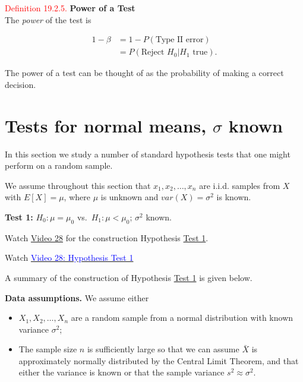 \documentclass[
]{book}
\providecommand{\tightlist}{%
  \setlength{\itemsep}{0pt}\setlength{\parskip}{0pt}}
\begin{document}
\leavevmode{}%
\textcolor{red}{Definition 19.2.5.}
{\textbf{Power of a Test}}\\
The \emph{power} of the test is

\begin{align*}
1-\beta &= 1-P(\text{Type II error}) \\
&= P(\text{Reject }H_0 | H_1 \text{ true}).
\end{align*}

The power of a test can be thought of as the probability of making a correct decision.

\hypertarget{Sec_Hypo_Test:normal_known}{%
\section{\texorpdfstring{Tests for normal means, \(\sigma\) known}{Tests for normal means, \textbackslash sigma known}}\label{Sec_Hypo_Test:normal_known}}

In this section we study a number of standard hypothesis tests that one might perform on a random sample.

We assume throughout this section that \(x_1, x_2, \ldots, x_n\) are i.i.d. samples from \(X\) with \(E[X]=\mu\), where \(\mu\) is unknown and \(var(X) = \sigma^2\) is known.

\leavevmode{}%
{\textbf{Test 1:}} \(H_0: \mu = \mu_0\) vs.~\(H_1: \mu < \mu_0\); \(\sigma^2\) known.

Watch \protect\hyperlink{video28}{Video 28} for the construction Hypothesis \protect\hyperlink{Sec_Hypo_Test:test1}{Test 1}.

Watch \href{https://mediaspace.nottingham.ac.uk/media/Hypothesis+Testing+FINAL+VERSION/1_9oauwn25}{\textcolor{blue}{Video 28: Hypothesis Test 1}}

A summary of the construction of Hypothesis \protect\hyperlink{Sec_Hypo_Test:test1}{Test 1} is given below.

\textbf{Data assumptions.} We assume either

\begin{itemize}
\tightlist
\item
  \(X_1,X_2,\dots,X_n\) are a random sample from a normal distribution with known variance \(\sigma^2\);\\
\item
  The sample size \(n\) is sufficiently large so that we can assume \(\bar{X}\) is approximately normally distributed by the Central Limit Theorem, and that either the variance is known or that the sample variance \(s^2 \approx \sigma^2\).
\end{itemize}
\end{document}
